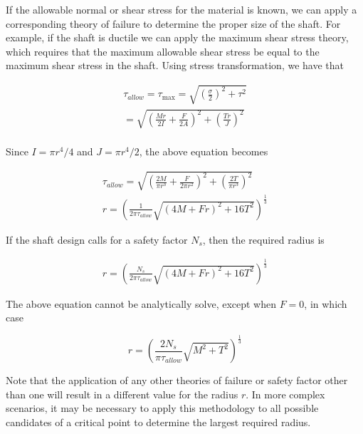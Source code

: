 \documentclass[
10pt,
a4paper,
openany,
svgnames,
]{book}
\begin{document}
If the allowable normal or shear stress for the material is known, we can apply a corresponding theory of failure to determine the proper size of the shaft. For example, if the shaft is ductile we can apply the maximum shear stress theory, which requires that the maximum allowable shear stress be equal to the maximum shear stress in the shaft. Using stress transformation, we have that

\[\begin{gathered}
    \tau_{allow} = \tau_{\max} = \sqrt {\left( \frac{\sigma}{2} \right)^2 + {\tau ^2}}  \\ 
    = \sqrt{ \left( \frac{Mr}{2I} + \frac{F}{2A} \right)^2 + \left( \frac{Tr}{J} \right)^2}  \\ 
  \end{gathered} \]

Since $I = \pi r^4/4$ and $J = \pi r^4/2$, the above equation becomes

\begin{equation}
  \begin{gathered}
    \tau_{allow} = \sqrt{ \left( \frac{2M}{\pi r^3} + \frac{F}{2 \pi r^2} \right)^2 + \left( \frac{2T}{\pi r^3} \right)^2 } \\
    r = \left( \frac{1}{2 \pi \tau _{allow}} \sqrt {(4M + Fr)^2 + 16T^2 } \right)^{\frac{1}{3}}
  \end{gathered}
\end{equation}

If the shaft design calls for a safety factor $N_s$, then the required radius is

\begin{gather*}
  r = \left( \frac{N_s}{2 \pi \tau _{allow}} \sqrt {(4M + Fr)^2 + 16T^2} \right)^{\frac{1}{3}}
\end{gather*}

The above equation cannot be analytically solve, except when $F=0$, in which case

\begin{equation} \label{eqn: shaft radius without axial}
  r = \left( \frac{2 N_s}{\pi \tau_{allow}}\sqrt {M^2 + T^2} \right)^{\frac{1}{3}} 
\end{equation}

Note that the application of any other theories of failure or safety factor other than one will result in a different value for the radius $r$. In more complex scenarios, it may be necessary to apply this methodology to all possible candidates of a critical point to determine the largest required radius.
\end{document}
